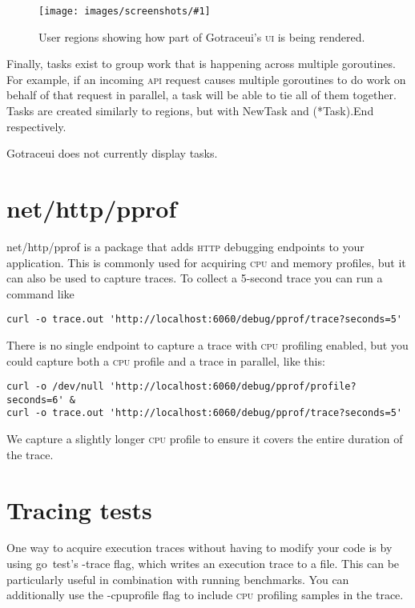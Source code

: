 \documentclass[10pt,letterpaper,oneside,openany,english]{memoir}
\newcommand{\code}[1]{{\ttfamily\mbox{#1}}}
\newcommand{\screenshot}[2]{%
\begin{figure}[!ht]
  \centering
  \texttt{[image: images/screenshots/\#1]}
  \caption{#2}
\end{figure}}
\begin{document}
\screenshot{user-regions.png}{User regions showing how part of Gotraceui's \textsc{ui} is being rendered.}

Finally, tasks exist to group work that is happening across multiple goroutines.
For example, if an incoming \textsc{api} request causes multiple goroutines to do work on behalf of that request in parallel, a task will be able to tie all of them together.
Tasks are created similarly to regions, but with \code{NewTask} and \code{(*Task).End} respectively.

Gotraceui does not currently display tasks.

\section{\code{net/http/pprof}}\label{net-http-pprof}

\code{net/http/pprof} is a package that adds \textsc{http} debugging endpoints to your application.
This is commonly used for acquiring \textsc{cpu} and memory profiles, but it can also be used to capture traces.
To collect a 5-second trace you can run a command like

\begin{verbatim}
curl -o trace.out 'http://localhost:6060/debug/pprof/trace?seconds=5'
\end{verbatim}

There is no single endpoint to capture a trace with \textsc{cpu} profiling enabled, but you could capture both a \textsc{cpu} profile and a trace in parallel, like this:

\begin{verbatim}
curl -o /dev/null 'http://localhost:6060/debug/pprof/profile?seconds=6' &
curl -o trace.out 'http://localhost:6060/debug/pprof/trace?seconds=5'
\end{verbatim}

We capture a slightly longer \textsc{cpu} profile to ensure it covers the entire duration of the trace.

\section{Tracing tests}

One way to acquire execution traces without having to modify your code is by using \code{go test}'s \code{-trace} flag, which writes an execution trace to a file.
This can be particularly useful in combination with running benchmarks.
You can additionally use the \code{-cpuprofile} flag to include \textsc{cpu} profiling samples in the trace.
\end{document}
